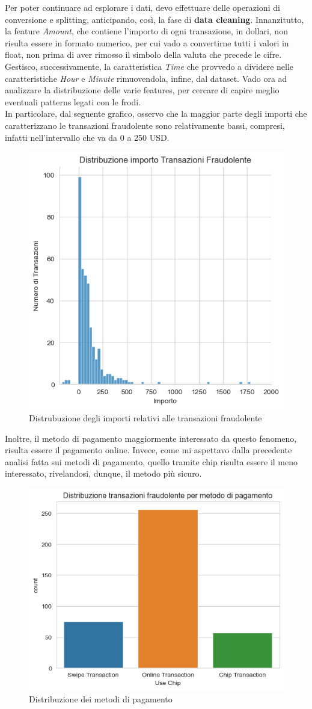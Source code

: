 \documentclass[]{article}
\begin{document}
        Per poter continuare ad esplorare i dati, devo effettuare delle operazioni di conversione e splitting, anticipando, così, la fase di \textbf{data cleaning}.
        Innanzitutto, la feature \textit{Amount}, che contiene l'importo di ogni transazione, in dollari, non risulta essere in formato numerico, per cui vado a convertirne tutti i valori in float, non prima di aver rimosso il simbolo della valuta che precede le cifre.\\
        Gestisco, successivamente, la caratteristica \textit{Time} che provvedo a dividere nelle caratteristiche \textit{Hour} e \textit{Minute} rimuovendola, infine, dal dataset.
        Vado ora ad analizzare la distribuzione delle varie features, per cercare di capire meglio eventuali patterns legati con le frodi.\\
        In particolare, dal seguente grafico, osservo che la maggior parte degli importi che caratterizzano le transazioni fraudolente sono relativamente bassi, compresi, infatti nell'intervallo che va da 0 a 250 USD.
        \begin{figure}[H]
            \centering
            \includegraphics[width=.3\textwidth]{img/DistribuzioneImporto.png}
            \caption[short]{Distrubuzione degli importi relativi alle transazioni fraudolente}
        \end{figure}
        Inoltre, il metodo di pagamento maggiormente interessato da questo fenomeno, risulta essere il pagamento online. Invece, come mi aspettavo dalla precedente analisi fatta sui metodi di pagamento, quello tramite chip risulta essere il meno interessato, rivelandosi, dunque, il metodo più sicuro.
        \begin{figure}[H]
            \centering
            \includegraphics[width=.4\textwidth]{img/DistribuzioneMetodoPagamento.png}
            \caption[short]{Distribuzione dei metodi di pagamento}
        \end{figure}
\end{document}
